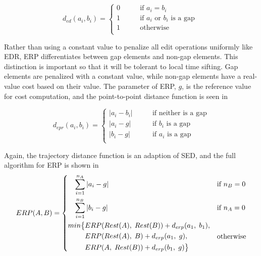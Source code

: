 \begin{equation}\label{eq:erp_ed}
    d_{ed}(a_i, b_i) = \begin{cases}
        0 &\qquad \text{if } a_i = b_i \\
        1 &\qquad \text{if } a_i \text{ or } b_i \text{ is a gap } \\
        1 &\qquad \text{otherwise } \\
    \end{cases}
\end{equation}

Rather than using a constant value to penalize all edit operations uniformly like EDR, ERP differentiates between gap elements and non-gap elements. 
This distinction is important so that it will be tolerant to local time sifting. 
Gap elements are penalized with a constant value, while non-gap elements have a real-value cost based on their value. 
The parameter of ERP,  $g$, is the reference value for cost computation, and the point-to-point distance function is seen in 

\begin{equation}\label{eq:erp_sub}
     d_{epr}(a_i, b_i) = \begin{cases}
        |a_i-b_i| & \qquad \text{if  neither is a gap} \\
        |a_i-g|   & \qquad \text{if } b_i \text{ is a gap} \\
        |b_i-g|   & \qquad \text{if } a_i \text{ is a gap} \\
     \end{cases}
 \end{equation}
 
 Again, the trajectory distance function is an adaption of SED, and the full algorithm for ERP is shown in 
\begin{equation}\label{eq:erp_main}
    ERP(A, B) = \begin{dcases}
        \quad \sum_{i=1}^{n_A}|a_i - g| & \text{if }  n_B = 0\\
        \quad \sum_{i=1}^{n_B}|b_i - g| & \text{if }  n_A = 0\\
        \begin{aligned}
        min\big\{   & {ERP}(Rest(A), \; Rest(B)) + d_{erp}(a_1,\;  b_1),\\
              	    & {ERP}(Rest(A), \; B) + d_{erp}(a_1, \; g),\\
           		    & {ERP}(A, \; Rest(B)) + d_{erp}( b_1,\; g) \big\}
        \end{aligned} & \text{otherwise}
  \end{dcases}
\end{equation}


